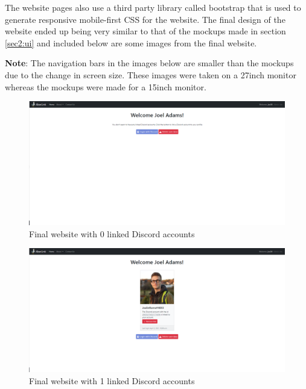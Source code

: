The website pages also use a third party library called bootstrap \cite{bootstrap} that is used to generate responsive mobile-first CSS for the website. The final design of the website ended up being very similar to that of the mockups made in section \ref{sec2:ui} and included below are some images from the final website.

\textbf{Note}: The navigation bars in the images below are smaller than the mockups due to the change in screen size. These images were taken on a 27inch monitor whereas the mockups were made for a 15inch monitor.

\begin{figure}[H]
	\centering
	\includegraphics[width=1\linewidth]{Figures/website-acc-0.png}
	\caption{Final website with 0 linked Discord accounts}
	\label{fig:final-web-acc-0}
\end{figure}

\begin{figure}[H]
	\centering
	\includegraphics[width=1\linewidth]{Figures/website-acc-1.png}
	\caption{Final website with 1 linked Discord accounts}
	\label{fig:final-web-acc-1}
\end{figure}

